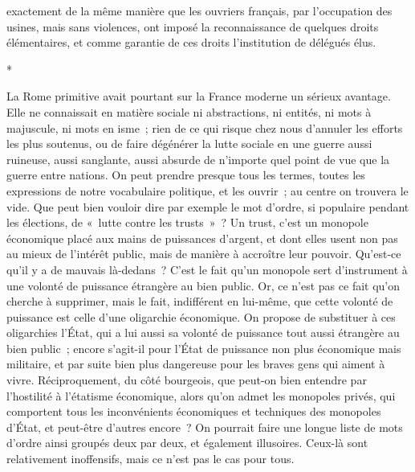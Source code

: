 \documentclass[french,twoside]{book} %
\begin{document}
exactement de la même manière que les ouvriers français, par l'occupation des usines, mais sans violences, ont imposé la reconnaissance de quelques droits élémentaires, et comme garantie de ces droits l'institution de délégués élus.\par

\begin{center}
*\end{center}
\noindent La Rome primitive avait pourtant sur la France moderne un sérieux avantage. Elle ne connaissait en matière sociale ni abstractions, ni entités, ni mots à majuscule, ni mots en isme ; rien de ce qui risque chez nous d'annuler les efforts les plus soutenus, ou de faire dégénérer la lutte sociale en une guerre aussi ruineuse, aussi sanglante, aussi absurde de n'importe quel point de vue que la guerre entre nations. On peut prendre presque tous les termes, toutes les expressions de notre vocabulaire politique, et les ouvrir ; au centre on trouvera le vide. Que peut bien vouloir dire par exemple le mot d'ordre, si populaire pendant les élections, de « lutte contre les trusts » ? Un trust, c'est un monopole économique placé aux mains de puissances d'argent, et dont elles usent non pas au mieux de l'intérêt public, mais de manière à accroître leur pouvoir. Qu'est-ce qu'il y a de mauvais là-dedans ? C'est le fait qu'un monopole sert d'instrument à une volonté de puissance étrangère au bien public. Or, ce n'est pas ce fait qu'on cherche à supprimer, mais le fait, indiffé­rent en lui-même, que cette volonté de puissance est celle d'une oligarchie économique. On propose de substituer à ces oligarchies l'État, qui a lui aussi sa volonté de puissance tout aussi étrangère au bien public ; encore s'agit-il pour l'État de puissance non plus économique mais militaire, et par suite bien plus dangereuse pour les braves gens qui aiment à vivre. Réciproquement, du côté bourgeois, que peut-on bien entendre par l'hostilité à l'étatisme écono­mique, alors qu'on admet les monopoles privés, qui comportent tous les inconvénients économiques et techniques des monopoles d'État, et peut-être d'autres encore ? On pourrait faire une longue liste de mots d'ordre ainsi groupés deux par deux, et également illusoires. Ceux-là sont relativement inoffensifs, mais ce n'est pas le cas pour tous.\par
\end{document}
